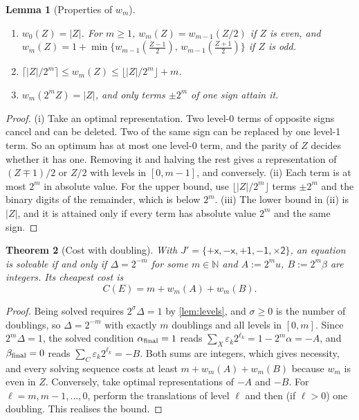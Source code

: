 \documentclass[11pt,a4paper]{article}
\newtheorem{theorem}{Theorem}[section]
\newtheorem{lemma}[theorem]{Lemma}
\theoremstyle{definition}
\theoremstyle{remark}
\newcommand{\N}{\mathbb{N}}
\newcommand{\pX}{\ensuremath{\mathord{+}\mathsf{x}}}
\newcommand{\mX}{\ensuremath{\mathord{-}\mathsf{x}}}
\newcommand{\pU}{\ensuremath{\mathord{+}\mathsf{1}}}
\newcommand{\mU}{\ensuremath{\mathord{-}\mathsf{1}}}
\newcommand{\dbl}{\ensuremath{\mathord{\times}\mathsf{2}}}
\newcommand{\abs}[1]{\lvert #1\rvert}
\begin{document}
\begin{lemma}[Properties of $w_m$]\label{lem:weight}
\leavevmode
\begin{enumerate}[label=(\roman*),nosep]
\item $w_0(Z)=\abs Z$. For $m\ge1$, $w_m(Z)=w_{m-1}(Z/2)$ if $Z$ is even, and
  $w_m(Z)=1+\min\{w_{m-1}(\tfrac{Z-1}2),\,w_{m-1}(\tfrac{Z+1}2)\}$ if $Z$ is odd.
\item $\lceil\abs Z/2^m\rceil\le w_m(Z)\le\lfloor\abs Z/2^m\rfloor+m$.
\item $w_m(2^mZ)=\abs Z$, and only terms $\pm2^m$ of one sign attain it.
\end{enumerate}
\end{lemma}
\begin{proof}
(i) Take an optimal representation. Two level-0 terms of opposite signs cancel and can
be deleted. Two of the same sign can be replaced by one level-1 term. So an optimum has
at most one level-0 term, and the parity of $Z$ decides whether it has one. Removing it
and halving the rest gives a representation of $(Z\mp1)/2$ or $Z/2$ with levels in
$[0,m-1]$, and conversely.
(ii) Each term is at most $2^m$ in absolute value. For the upper bound, use
$\lfloor\abs Z/2^m\rfloor$ terms $\pm2^m$ and the binary digits of the remainder, which is
below $2^m$.
(iii) The lower bound in (ii) is $\abs Z$, and it is attained only if every term has
absolute value $2^m$ and the same sign.
\end{proof}

\begin{theorem}[Cost with doubling]\label{thm:double}
With $J'=\{\pX,\mX,\pU,\mU,\dbl\}$, an equation is solvable if and only if
$\Delta=2^{-m}$ for some $m\in\N$ and $A:=2^mu$, $B:=2^m\beta$ are integers. Its
cheapest cost is
\[
C(E)=m+w_m(A)+w_m(B).
\]
\end{theorem}
\begin{proof}
Being solved requires $2^\sigma\Delta=1$ by \cref{lem:levels}, and $\sigma\ge0$ is the
number of doublings, so $\Delta=2^{-m}$ with exactly $m$ doublings and all levels in
$[0,m]$. Since $2^m\Delta=1$, the solved condition $\alpha_{\rm final}=1$ reads
$\sum_X\varepsilon_k2^{\ell_k}=1-2^m\alpha=-A$, and $\beta_{\rm final}=0$ reads
$\sum_C\varepsilon_k2^{\ell_k}=-B$. Both sums are integers, which gives necessity, and
every solving sequence costs at least $m+w_m(A)+w_m(B)$ because $w_m$ is even in $Z$.
Conversely, take optimal representations of $-A$ and $-B$. For $\ell=m,m-1,\dots,0$,
perform the translations of level $\ell$ and then (if $\ell>0$) one doubling. This
realises the bound.
\end{proof}
\end{document}
